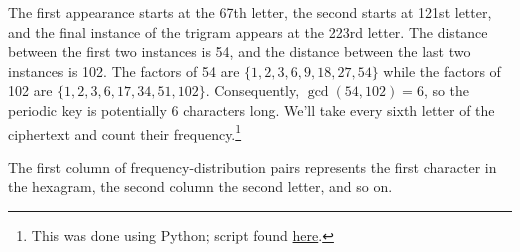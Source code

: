 \documentclass[12pt]{article}
\theoremstyle{remark}  %
\begin{document}
    The first appearance starts at the 67th letter, the second starts at 121st letter, and the final instance of the trigram appears at the 223rd letter. The distance between the first two instances is 54, and the distance between the last two instances is 102. The factors of 54 are $\{1, 2, 3, 6, 9, 18, 27, 54\}$ while the factors of 102 are $\{1, 2, 3, 6, 17, 34, 51, 102\}$. Consequently, $\gcd(54, 102)=6$, so the periodic key is potentially 6 characters long. We'll take every sixth letter of the ciphertext and count their frequency.\footnote{This was done using Python; script found \hyperlink{https://github.com/rawsonduplantis/MTH4312/blob/main/HW1/hw1.py}{here}.} \par The first column of frequency-distribution pairs represents the first character in the hexagram, the second column the second letter, and so on.
\end{document}
